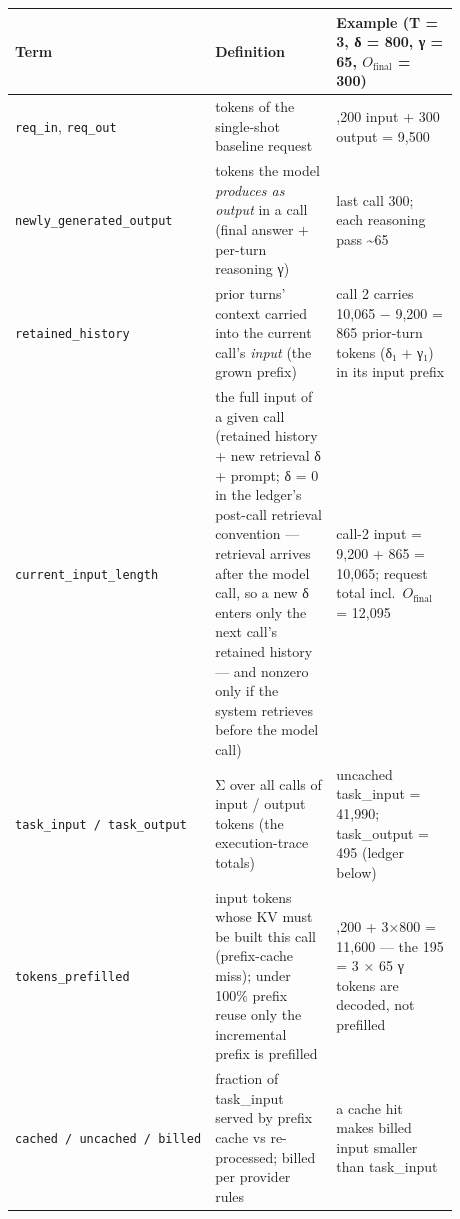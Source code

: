 \nopagebreak[4]
\begin{longtable}[]{@{}
  >{\raggedright\arraybackslash}p{0.2927\linewidth}
  >{\raggedright\arraybackslash}p{0.2927\linewidth}
  >{\raggedright\arraybackslash}p{0.2927\linewidth}@{}}
\toprule\noalign{}
\begin{minipage}[b]{\linewidth}\raggedright
Term
\end{minipage} & \begin{minipage}[b]{\linewidth}\raggedright
Definition
\end{minipage} & \begin{minipage}[b]{\linewidth}\raggedright
Example (T = 3, δ = 800, γ = 65, \(O_\text{final}\) = 300)
\end{minipage} \\
\midrule\noalign{}
\endhead
\bottomrule\noalign{}
\endlastfoot
\texttt{req\_in}, \texttt{req\_out} & tokens of the single-shot baseline
request & 9,200 input + 300 output = 9,500 \\
\noalign{\label{tab:19.2}}
\texttt{newly\_generated\_output} & tokens the model \emph{produces as
output} in a call (final answer + per-turn reasoning γ) & last call 300;
each reasoning pass \textasciitilde65 \\
\texttt{retained\_history} & prior turns' context carried into the
current call's \emph{input} (the grown prefix) & call 2 carries 10,065 −
9,200 = 865 prior-turn tokens (δ₁ + γ₁) in its input prefix \\
\texttt{current\_input\_length} & the full input of a given call
(retained history + new retrieval δ + prompt; δ = 0 in the ledger's
post-call retrieval convention --- retrieval arrives after the model
call, so a new δ enters only the next call's retained history --- and
nonzero only if the system retrieves before the model call) & call-2
input = 9,200 + 865 = 10,065; request total incl.~\(O_\text{final}\) =
12,095 \\
\texttt{task\_input\ /\ task\_output} & Σ over all calls of input /
output tokens (the execution-trace totals) & uncached task\_input =
41,990; task\_output = 495 (ledger below) \\
\texttt{tokens\_prefilled} & input tokens whose KV must be built this
call (prefix-cache miss); under 100\% prefix reuse only the incremental
prefix is prefilled & 9,200 + 3×800 = 11,600 --- the 195 = 3 × 65 γ
tokens are decoded, not prefilled \\
\texttt{cached\ /\ uncached\ /\ billed} & fraction of task\_input served
by prefix cache vs re-processed; billed per provider rules & a cache hit
makes billed input smaller than task\_input \\
\end{longtable}

